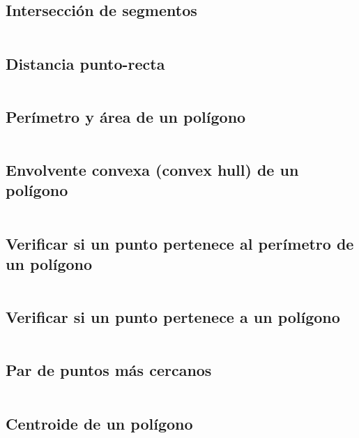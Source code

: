 \documentclass[11pt]{article}
\begin{document}
		\subsection{Intersección de segmentos}
		\inputminted[tabsize=2,breaklines,firstline=150,lastline=167,fontsize=\small]{c++}{geometry.cpp}
		
		\subsection{Distancia punto-recta}
		\inputminted[tabsize=2,breaklines,firstline=169,lastline=172,fontsize=\small]{c++}{geometry.cpp}
		
		\subsection{Perímetro y área de un polígono}
		\inputminted[tabsize=2,breaklines,firstline=174,lastline=190,fontsize=\small]{c++}{geometry.cpp}
		
		\subsection{Envolvente convexa (convex hull) de un polígono}
		\inputminted[tabsize=2,breaklines,firstline=192,lastline=211,fontsize=\small]{c++}{geometry.cpp}
		
		\subsection{Verificar si un punto pertenece al perímetro de un polígono}
		\inputminted[tabsize=2,breaklines,firstline=213,lastline=221,fontsize=\small]{c++}{geometry.cpp}
		
		\subsection{Verificar si un punto pertenece a un polígono}
		\inputminted[tabsize=2,breaklines,firstline=223,lastline=234,fontsize=\small]{c++}{geometry.cpp}
		
		\subsection{Par de puntos más cercanos}
		\inputminted[tabsize=2,breaklines,firstline=236,lastline=262,fontsize=\small]{c++}{geometry.cpp}
		
		\subsection{Centroide de un polígono}
		\inputminted[tabsize=2,breaklines,firstline=264,lastline=274,fontsize=\small]{c++}{geometry.cpp}
		
\end{document}
